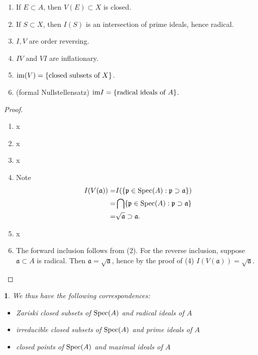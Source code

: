 \documentclass[12pt]{article}
\newtheorem{para}[theorem]{}
\begin{document}
\begin{corollary}
	\hfill 
	\begin{enumerate}
		\item If $E\subset A$, then $V(E)\subset X$ is closed.
		\item If $S\subset X$, then $I(S)$ is an intersection of prime ideals, hence radical.
		\item $I,V$ are order reversing.
		\item $IV$ and $VI$ are inflationary.
		\item $\text{im}(V)=\{\text{closed subsets of }X\}$.
		\item (formal Nullstellensatz) $\text{im} I=\{\text{radical ideals of }A\}$.
	\end{enumerate}
\end{corollary}
\begin{proof}
	\hfill 
	\begin{enumerate}
		\item x 
		\item x 
		\item x 
		\item Note
			\begin{align*}
				I(V(\mathfrak{a})) 
				=& I(\{\mathfrak{p}\in\text{Spec}(A) : \mathfrak{p}\supset\mathfrak{a}\}) \\
				=& \bigcap \{\mathfrak{p}\in\text{Spec}(A) : \mathfrak{p}\supset\mathfrak{a}\} \\
				=& \sqrt{\mathfrak{a}}\supset\mathfrak{a}.
			\end{align*}
		\item x 
		\item The forward inclusion follows from (2). For the reverse inclusion, suppose $\mathfrak{a}\subset A$ is radical. Then $\mathfrak{a}=\sqrt{\mathfrak{a}}$, hence by the proof of (4) $I(V(\mathfrak{a}))=\sqrt{\mathfrak{a}}$.
	\end{enumerate}
\end{proof}

\begin{para}
	We thus have the following correspondences:
	\begin{itemize}
		\item Zariski closed subsets of $\text{Spec}(A)$ and radical ideals of $A$
		\item irreducible closed subsets of $\text{Spec}(A)$ and prime ideals of $A$
		\item closed points of $\text{Spec}(A)$ and maximal ideals of $A$
	\end{itemize}
\end{para}
\end{document}
